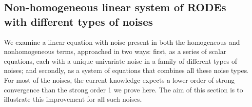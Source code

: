 \documentclass[reqno,12pt]{amsart}
\theoremstyle{plain} %
\theoremstyle{definition} %
\begin{document}
\subsection{Non-homogeneous linear system of RODEs with different types of noises}
\label{subseclinearrodenumerics}

We examine a linear equation with noise present in both the homogeneous and nonhomogeneous terms, approached in two ways: first, as a series of scalar equations, each with a unique univariate noise in a family of different types of noises; and secondly, as a system of equations that combines all these noise types. For most of the noises, the current knowledge expects a lower order of strong convergence than the strong order 1 we prove here. The aim of this section is to illustrate this improvement for all such noises.
\end{document}
